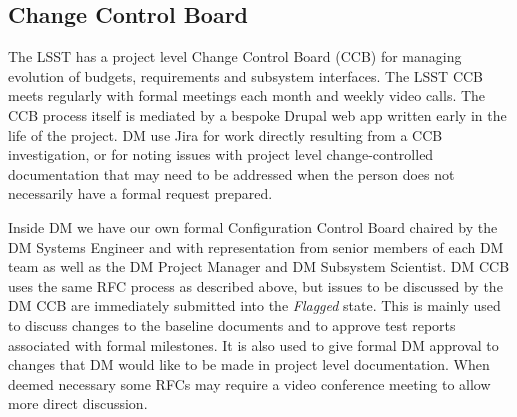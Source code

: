 \subsection{Change Control Board}
\label{sec:ccb}

The LSST has a project level Change Control Board (CCB) for managing evolution of budgets, requirements and subsystem interfaces.
The LSST CCB meets regularly with formal meetings each month and weekly video calls.
The CCB process itself is mediated by a bespoke Drupal web app written early in the life of the project.
DM  use Jira for work directly resulting from a CCB investigation, or for noting issues with project level change-controlled documentation that may need to be addressed when the person does not necessarily have a formal request prepared.

Inside DM we have our own formal Configuration Control Board
chaired by the DM Systems Engineer and with  representation from senior members of each DM team as well as the DM Project Manager and DM Subsystem Scientist.
DM CCB uses the same RFC process as described above, but issues to be discussed by the DM CCB are immediately submitted into the \emph{Flagged} state.
This is mainly used to discuss changes to the baseline documents and to approve test reports associated with formal milestones.
It is also used to give formal DM approval to changes that DM would like to be made in project level documentation.
When deemed necessary some RFCs may require a video conference meeting to allow more direct discussion.
